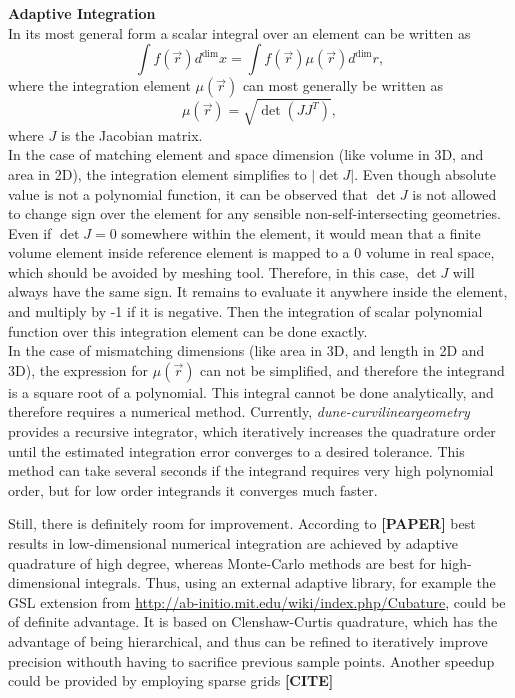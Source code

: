 \noindent
\textbf{Adaptive Integration}\\
In its most general form a scalar integral over an element can be written as \[\int f(\vec{r}) d^{\dim} x = \int f(\vec{r}) \mu(\vec{r}) d^{\dim} r,\] where the integration element $\mu(\vec{r})$ can most generally be written as \[\mu(\vec{r}) = \sqrt{\det(J J^T)},\] where $J$ is the Jacobian matrix. \\

\noindent
In the case of matching element and space dimension (like volume in 3D, and area in 2D), the integration element simplifies to $|\det J|$. Even though absolute value is not a polynomial function, it can be observed that $\det J$ is not allowed to change sign over the element for any sensible non-self-intersecting geometries. Even if $\det J = 0$ somewhere within the element, it would mean that a finite volume element inside reference element is mapped to a 0 volume in real space, which should be avoided by meshing tool. Therefore, in this case, $\det J$ will always have the same sign. It remains to evaluate it anywhere inside the element, and multiply by -1 if it is negative. Then the integration of scalar polynomial function over this integration element can be done exactly. \\

\noindent
In the case of mismatching dimensions (like area in 3D, and length in 2D and 3D), the expression for $\mu(\vec{r})$ can not be simplified, and therefore the integrand is a square root of a polynomial. This integral cannot be done analytically, and therefore requires a numerical method. Currently, \textit{dune-curvilineargeometry} provides a recursive integrator, which iteratively increases the quadrature order until the estimated integration error converges to a desired tolerance. This method can take several seconds if the integrand requires very high polynomial order, but for low order integrands it converges much faster.

\noindent
Still, there is definitely room for improvement. According to \textbf{[PAPER]} best results in low-dimensional numerical integration are achieved by adaptive quadrature of high degree, whereas Monte-Carlo methods are best for high-dimensional integrals. Thus, using an external adaptive library, for example the GSL extension from \url{http://ab-initio.mit.edu/wiki/index.php/Cubature}, could be of definite advantage. It is based on Clenshaw-Curtis quadrature, which has the advantage of being hierarchical, and thus can be refined to iteratively improve precision withouth having to sacrifice previous sample points. Another speedup could be provided by employing sparse grids \textbf{[CITE]} \\

